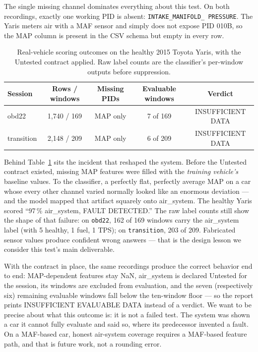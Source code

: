 The single missing channel dominates everything about this test. On both
recordings, exactly one working PID is absent: \texttt{INTAKE\_MANIFOLD\_%
PRESSURE}. The Yaris meters air with a MAF sensor and simply does not
expose PID 010B, so the MAP column is present in the CSV schema but empty
in every row.

\begin{table}[H]
  \centering
  \caption{Real-vehicle scoring outcomes on the healthy 2015 Toyota Yaris,
    with the Untested contract applied. Raw label counts are the
    classifier's per-window outputs before suppression.}
  \label{tab:yaris}
  \begin{tabular}{lcccc}
    \toprule
    Session & Rows / windows & Missing PIDs & Evaluable windows & Verdict\\
    \midrule
    obd22      & 1{,}740 / 169 & MAP only & 7 of 169 & INSUFFICIENT DATA\\
    transition & 2{,}148 / 209 & MAP only & 6 of 209 & INSUFFICIENT DATA\\
    \bottomrule
  \end{tabular}
\end{table}

Behind Table~\ref{tab:yaris} sits the incident that reshaped the system.
Before the Untested contract existed, missing MAP features were filled with
the \emph{training vehicle's} baseline values. To the classifier, a
perfectly flat, perfectly average MAP on a car whose every other channel
varied normally looked like an enormous deviation --- and the model mapped
that artifact squarely onto air\_system. The healthy Yaris scored
``97\,\% air\_system, FAULT DETECTED.'' The raw label counts still show the
shape of that failure: on \texttt{obd22}, 162 of 169 windows carry the
air\_system label (with 5 healthy, 1 fuel, 1 TPS); on \texttt{transition},
203 of 209. Fabricated sensor values produce confident wrong answers ---
that is the design lesson we consider this test's main deliverable.

With the contract in place, the same recordings produce the correct
behavior end to end: MAP-dependent features stay NaN, air\_system is
declared Untested for the session, its windows are excluded from
evaluation, and the seven (respectively six) remaining evaluable windows
fall below the ten-window floor --- so the report prints INSUFFICIENT
EVALUABLE DATA instead of a verdict. We want to be precise about what this
outcome is: it is not a failed test. The system was shown a car it cannot
fully evaluate and said so, where its predecessor invented a fault. On a
MAF-based car, honest air-system coverage requires a MAF-based feature
path, and that is future work, not a rounding error.

